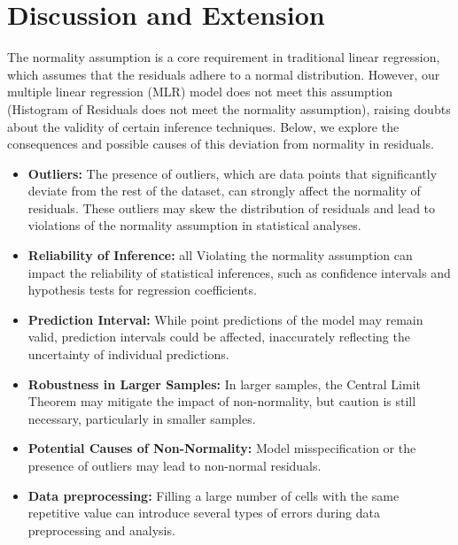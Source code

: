 \section{Discussion and Extension}
\tab The normality assumption is a core requirement in traditional linear regression, which assumes that the residuals adhere to a normal distribution. However, our multiple linear regression (MLR) model does not meet  this assumption (Histogram of Residuals does not meet the normality assumption), raising doubts about the validity of certain inference techniques. Below, we explore the consequences and possible causes of this deviation from normality in residuals. 
\begin{itemize}
        \item \textbf{Outliers:} The presence of outliers, which are data points that significantly deviate from the rest of the dataset, can strongly affect the normality of residuals. These outliers may skew the distribution of residuals and lead to violations of the normality assumption in statistical analyses. 
        \item \textbf{Reliability of Inference:} all Violating the normality assumption can impact the reliability of statistical inferences, such as confidence intervals and hypothesis tests for regression coefficients. 
        \item \textbf{Prediction Interval:} While point predictions of the model may remain valid, prediction intervals could be affected, inaccurately reflecting the uncertainty of individual predictions. 
        \item \textbf{Robustness in Larger Samples:} In larger samples, the Central Limit Theorem may mitigate the impact of non-normality, but caution is still necessary, particularly in smaller samples. 
        \item \textbf{Potential Causes of Non-Normality:} Model misspecification or the presence of outliers may lead to non-normal residuals.
        \item \textbf{Data preprocessing:} Filling a large number of cells with the same repetitive value can introduce several types of errors during data preprocessing and analysis. 
        
    \end{itemize}